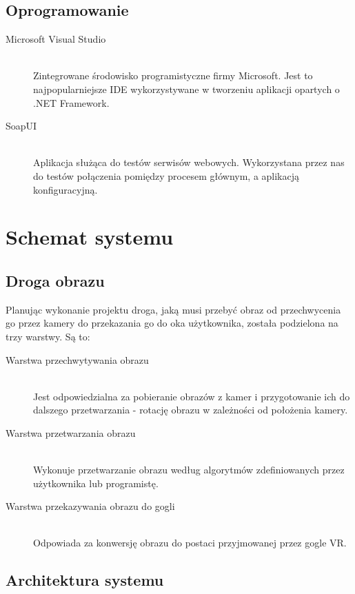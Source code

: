 \documentclass[a4paper,11pt,twoside]{report}
\theoremstyle{definition}
\begin{document}
\subsection {Oprogramowanie}

\begin{description}
\item [Microsoft Visual Studio] \hfill \\
Zintegrowane środowisko programistyczne firmy Microsoft. Jest to najpopularniejsze IDE wykorzystywane w tworzeniu aplikacji opartych o .NET Framework.
\item [SoapUI] \hfill \\
Aplikacja służąca do testów serwisów webowych. Wykorzystana przez nas do testów połączenia pomiędzy procesem głównym, a aplikacją konfiguracyjną.
\end{description}

\section {Schemat systemu}

\subsection {Droga obrazu}

Planując wykonanie projektu droga, jaką musi przebyć obraz od przechwycenia go przez kamery do przekazania go do oka użytkownika, została podzielona na trzy warstwy. Są to:

\begin{description}
\item [Warstwa przechwytywania obrazu] \hfill \\ Jest odpowiedzialna za pobieranie obrazów z kamer i przygotowanie ich do dalszego przetwarzania - rotację obrazu w zależności od położenia kamery.
\item [Warstwa przetwarzania obrazu] \hfill \\ Wykonuje przetwarzanie obrazu według algorytmów zdefiniowanych przez użytkownika lub programistę.
\item [Warstwa przekazywania obrazu do gogli] \hfill \\ Odpowiada za konwersję obrazu do postaci przyjmowanej przez gogle VR.
\end{description}

\subsection{Architektura systemu}
\end{document}
